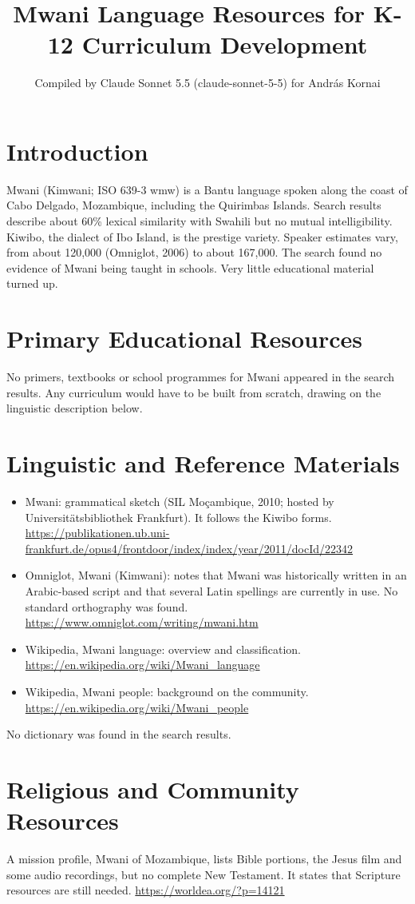 \documentclass[12pt]{article}
\title{Mwani Language Resources for K-12 Curriculum Development}
\author{Compiled by Claude Sonnet 5.5 (claude-sonnet-5-5) for Andr\'as Kornai}
\date{}
\begin{document}
\maketitle

\section{Introduction}
Mwani (Kimwani; ISO 639-3 wmw) is a Bantu language spoken along the coast of Cabo Delgado, Mozambique, including the Quirimbas Islands. Search results describe about 60\% lexical similarity with Swahili but no mutual intelligibility. Kiwibo, the dialect of Ibo Island, is the prestige variety. Speaker estimates vary, from about 120,000 (Omniglot, 2006) to about 167,000. The search found no evidence of Mwani being taught in schools. Very little educational material turned up.

\section{Primary Educational Resources}
No primers, textbooks or school programmes for Mwani appeared in the search results. Any curriculum would have to be built from scratch, drawing on the linguistic description below.

\section{Linguistic and Reference Materials}
\begin{itemize}
\item Mwani: grammatical sketch (SIL Mo\c{c}ambique, 2010; hosted by Universit\"atsbibliothek Frankfurt). It follows the Kiwibo forms. \url{https://publikationen.ub.uni-frankfurt.de/opus4/frontdoor/index/index/year/2011/docId/22342}
\item Omniglot, Mwani (Kimwani): notes that Mwani was historically written in an Arabic-based script and that several Latin spellings are currently in use. No standard orthography was found. \url{https://www.omniglot.com/writing/mwani.htm}
\item Wikipedia, Mwani language: overview and classification. \url{https://en.wikipedia.org/wiki/Mwani_language}
\item Wikipedia, Mwani people: background on the community. \url{https://en.wikipedia.org/wiki/Mwani_people}
\end{itemize}
No dictionary was found in the search results.

\section{Religious and Community Resources}
A mission profile, Mwani of Mozambique, lists Bible portions, the Jesus film and some audio recordings, but no complete New Testament. It states that Scripture resources are still needed. \url{https://worldea.org/?p=14121}
\end{document}
